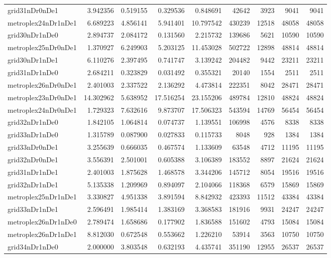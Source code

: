 \begin{longtable}{|l|r|r|r|r|r|r|r|r|}
grid31nDr0nDe1 & 3.942356 & 0.519155 & 0.329536 & 0.848691 & 42642 & 3923 & 9041 & 9041 \\
metroplex24nDr1nDe1 & 6.689223 & 4.856141 & 5.941401 & 10.797542 & 430239 & 12518 & 48058 & 48058 \\
grid30nDr1nDe0 & 2.894737 & 2.084172 & 0.131560 & 2.215732 & 139686 & 5621 & 10590 & 10590 \\
metroplex25nDr0nDe1 & 1.370927 & 6.249903 & 5.203125 & 11.453028 & 502722 & 12898 & 48814 & 48814 \\
grid30nDr1nDe1 & 6.110276 & 2.397495 & 0.741747 & 3.139242 & 204482 & 9442 & 23211 & 23211 \\
grid31nDr1nDe0 & 2.684211 & 0.323829 & 0.031492 & 0.355321 & 20140 & 1554 & 2511 & 2511 \\
metroplex26nDr0nDe1 & 2.401003 & 2.337522 & 2.136292 & 4.473814 & 222351 & 8042 & 28471 & 28471 \\
metroplex23nDr0nDe1 & 14.302962 & 5.638952 & 17.516254 & 23.155206 & 489784 & 12810 & 48824 & 48824 \\
metroplex24nDr0nDe1 & 1.729323 & 7.632616 & 9.873707 & 17.506323 & 543594 & 14769 & 56454 & 56454 \\
grid32nDr1nDe0 & 1.842105 & 1.064814 & 0.074737 & 1.139551 & 106998 & 4576 & 8338 & 8338 \\
grid33nDr1nDe0 & 1.315789 & 0.087900 & 0.027833 & 0.115733 & 8048 & 928 & 1384 & 1384 \\
grid33nDr0nDe1 & 3.255639 & 0.666035 & 0.467574 & 1.133609 & 63548 & 4712 & 11195 & 11195 \\
grid32nDr0nDe1 & 3.556391 & 2.501001 & 0.605388 & 3.106389 & 183552 & 8897 & 21624 & 21624 \\
grid31nDr1nDe1 & 2.401003 & 1.875628 & 1.468578 & 3.344206 & 145712 & 8054 & 19516 & 19516 \\
grid32nDr1nDe1 & 5.135338 & 1.209969 & 0.894097 & 2.104066 & 118368 & 6579 & 15869 & 15869 \\
metroplex25nDr1nDe1 & 3.330827 & 4.951338 & 3.891594 & 8.842932 & 423393 & 11512 & 43384 & 43384 \\
grid33nDr1nDe1 & 2.596491 & 1.985414 & 1.383169 & 3.368583 & 181916 & 9931 & 24247 & 24247 \\
metroplex26nDr1nDe0 & 2.789474 & 1.658686 & 0.177902 & 1.836588 & 151602 & 4793 & 15084 & 15084 \\
metroplex26nDr1nDe1 & 8.812030 & 0.672548 & 0.553662 & 1.226210 & 53914 & 3563 & 10750 & 10750 \\
grid34nDr1nDe0 & 2.000000 & 3.803548 & 0.632193 & 4.435741 & 351190 & 12955 & 26537 & 26537 \\

\end{longtable}
